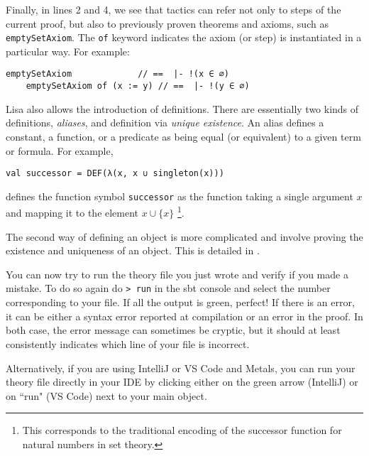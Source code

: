 Finally, in lines 2 and 4, we see that tactics can refer not only to steps of the
current proof, but also to previously proven theorems and axioms, such as
\lstinline|emptySetAxiom|. The \lstinline|of| keyword indicates the axiom (or
step) is instantiated in a particular way. For example:

\noindent
\begin{minipage}{\linewidth}\vspace{1em}
  \begin{lstlisting}[language=lisa, frame=single, numbers=none]
    emptySetAxiom             // ==  |- !(x ∈ ∅)
    emptySetAxiom of (x := y) // ==  |- !(y ∈ ∅)
\end{lstlisting}
\end{minipage}

Lisa also allows the introduction of definitions. There are essentially two
kinds of definitions, \emph{aliases}, and definition via \emph{unique
existence}. An alias defines a constant, a function, or a predicate as being
equal (or equivalent) to a given term or formula. For example,

\noindent
\begin{minipage}{\linewidth}\vspace{1em}
  \begin{lstlisting}[language=lisa, frame=single, numbers=none]
  val successor = DEF(λ(x, x ∪ singleton(x)))
\end{lstlisting}
\end{minipage}
defines the function symbol \lstinline|successor| as the function taking a
single argument $x$ and mapping it to the element $x \cup \lbrace x \rbrace$
\footnote{This corresponds to the traditional encoding of the successor function
for natural numbers in set theory.}.

The second way of defining an object is more complicated and involve proving the existence and uniqueness of an object. This is detailed in .

You can now try to run the theory file you just wrote and verify if you made a mistake. To do so again do \lstinline|> run| in the sbt console and select the number corresponding to your file.
If all the output is green, perfect! If there is an error, it can be either a syntax error reported at compilation or an error in the proof. In both case, the error message can sometimes be cryptic, but it should at least consistently indicates which line of your file is incorrect.

Alternatively, if you are using IntelliJ or VS Code and Metals, you can run your theory file directly in your IDE by clicking either on the green arrow (IntelliJ) or on ``run" (VS Code) next to your main object.

